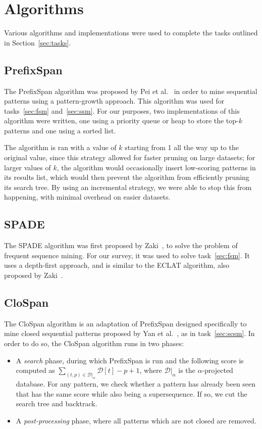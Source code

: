 \documentclass{sigkddExp}
\newcommand{\db}{\mathcal{D}}
\newcommand{\ps}{\textsf{PrefixSpan}}
\newcommand{\cs}{\textsf{CloSpan}}
\newcommand{\spade}{\textsf{SPADE}}
\begin{document}
\section{Algorithms}
Various algorithms and implementations were used to complete the tasks outlined in Section~\ref{sec:tasks}.

\subsection{PrefixSpan}
The \ps{} algorithm was proposed by Pei et al.~\cite{Pei2001, Pei2004} in order to mine sequential patterns using a pattern-growth approach.
This algorithm was used for tasks~\ref{sec:fsm} and~\ref{sec:ssm}.
For our purposes, two implementations of this algorithm were written, one using a priority queue or heap to store the top-\(k\) patterns and one using a sorted list.

The algorithm is ran with a value of \(k\) starting from 1 all the way up to the original value, since this strategy allowed for faster pruning on large datasets; for larger values of \(k\), the algorithm would occasionally insert low-scoring patterns in its results list, which would then prevent the algorithm from efficiently pruning its search tree.
By using an incremental strategy, we were able to stop this from happening, with minimal overhead on easier datasets.

\subsection{SPADE}
The \spade{} algorithm was first proposed by Zaki~\cite{Zaki2001}, to solve the problem of frequent sequence mining.
For our survey, it was used to solve task~\ref{sec:fsm}.
It uses a depth-first approach, and is similar to the \textsf{ECLAT} algorithm, also proposed by Zaki~\cite{Zaki2000}.

\subsection{CloSpan}
\label{sec:clospan}
The \cs{} algorithm is an adaptation of \ps{} designed specifically to mine closed sequential patterns proposed by Yan et al.~\cite{Yan2003}, as in task~\ref{sec:scsm}.
In order to do so, the \cs{} algorithm runs in two phases:
\begin{itemize}
	\item A \emph{search} phase, during which \ps{} is run and the following score is computed as \(\sum_{(t, p) \in \db|_\alpha} \db[t] - p + 1\), where \(\db|_\alpha\) is the \(\alpha\)-projected database.
	For any pattern, we check whether a pattern has already been seen that has the same score while also being a supersequence.
	If so, we cut the search tree and backtrack.
	\item A \emph{post-processing} phase, where all patterns which are not closed are removed.
\end{itemize}
\end{document}
